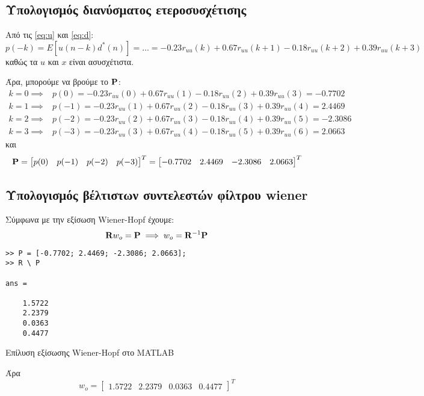 \subsection{Υπολογισμός διανύσματος ετεροσυσχέτισης}
Από τις \eqref{eq:u} και \eqref{eq:d}:
\begin{dmath}
p(-k) = E[u(n - k) d^*(n)] = \ldots =
-0.23r_{uu}(k)+0.67r_{uu}(k+1)-0.18r_{uu}(k+2)+0.39r_{uu}(k+3)
\end{dmath}
καθώς τα $u$ και $x$ είναι ασυσχέτιστα.

Άρα, μπορούμε να βρούμε το $\mathbf{P}$:
\begin{align*}
k = 0 \implies& p(0)  = -0.23r_{uu}(0)+0.67r_{uu}(1)-0.18r_{uu}(2)+0.39r_{uu}(3) = -0.7702\\
k = 1 \implies& p(-1) = -0.23r_{uu}(1)+0.67r_{uu}(2)-0.18r_{uu}(3)+0.39r_{uu}(4) = 2.4469\\
k = 2 \implies& p(-2) = -0.23r_{uu}(2)+0.67r_{uu}(3)-0.18r_{uu}(4)+0.39r_{uu}(5) = -2.3086\\
k = 3 \implies& p(-3) = -0.23r_{uu}(3)+0.67r_{uu}(4)-0.18r_{uu}(5)+0.39r_{uu}(6) = 2.0663
\end{align*}
και
\begin{equation}
\mathbf{P} = \begin{bmatrix} p(0) & p(-1) & p(-2) & p(-3)\end{bmatrix}^T = \begin{bmatrix} -0.7702 & 2.4469 & -2.3086 & 2.0663 \end{bmatrix}^T
\end{equation}

\subsection{Υπολογισμός βέλτιστων συντελεστών φίλτρου wiener}
Σύμφωνα με την εξίσωση Wiener-Hopf έχουμε:
\begin{equation}
\mathbf{R} w_o = \mathbf{P} \implies w_o = \mathbf{R}^{-1}\mathbf{P}
\end{equation}
\begin{code}
\begin{verbatim}
>> P = [-0.7702; 2.4469; -2.3086; 2.0663];
>> R \ P

ans =

    1.5722
    2.2379
    0.0363
    0.4477
\end{verbatim}
\caption{Επίλυση εξίσωσης Wiener-Hopf στο MATLAB}
\end{code}
Άρα
\begin{equation}
w_o = \begin{bmatrix} 1.5722 & 2.2379 & 0.0363 & 0.4477 \end{bmatrix}^T
\end{equation}
